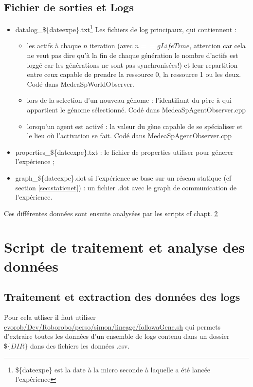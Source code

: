 \documentclass[a4paper,10pt]{report}
\begin{document}
\section{Fichier de sorties et Logs}
\begin{itemize}

\item datalog\_\$\{dateexpe\}.txt\footnote{\$\{dateexpe\} est la date à la micro seconde à laquelle a été lancée l'expérience} Les fichiers de log principaux, qui contiennent : 
\begin{itemize}

\item les actifs à chaque $n$ iteration (avec $n == gLifeTime$, attention car cela ne veut pas dire qu'à la fin de chaque génération le nombre d'actifs est loggé car les générations ne sont pas synchronisées!) et leur repartition entre ceux capable de prendre la ressource 0, la ressource 1 ou les deux. Codé dans MedeaSpWorldObserver.
 \item lors de la selection d'un nouveau génome : l'identifiant du père à qui appartient le génome sélectionné. Codé dans MedeaSpAgentObserver.cpp
 \item lorsqu'un agent est activé : la valeur du gène capable de se spécialiser et le lieu où l'activation se fait. Codé dans MedeaSpAgentObserver.cpp
\end{itemize}

\item properties\_\$\{dateexpe\}.txt : le fichier de properties utiliser pour génerer l'expérience ;

\item graph\_\$\{dateexpe\}.dot si l'expérience se base sur un réseau statique (cf section \ref{sec:staticnet}) : un fichier .dot avec le graph de communication de l'expérience.

\end{itemize}



Ces différentes données sont ensuite analysées par les scripts cf chapt. \ref{ch:script}



\chapter{Script de traitement et analyse des données}
\label{ch:script}

\section{Traitement et extraction des données des logs}
\label{sec:scriptextract}
Pour cela utliser il faut utiliser \url{evorob/Dev/Roborobo/perso/simon/lineage/followaGene.sh}
qui permets d'extraire toutes les données d'un ensemble de logs contenu dans un dossier $\$\{DIR\}$ dans des fichiers les données .csv.
\end{document}
